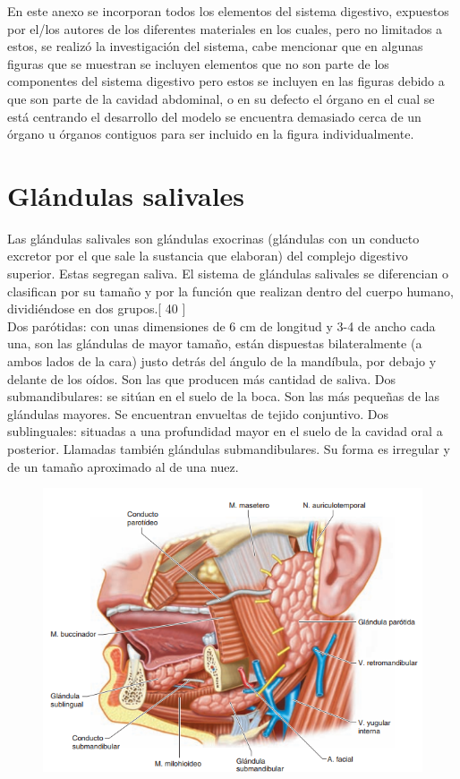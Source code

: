 \appendix  
\addappheadtotoc 
\appendixpage 

En este anexo se incorporan todos los elementos del sistema digestivo, expuestos por el/los autores de los diferentes materiales en los cuales, 
pero no limitados a estos, se realizó la investigación del sistema, cabe mencionar que en algunas figuras que se muestran se incluyen elementos 
que no son parte de los componentes del sistema digestivo pero estos se incluyen en las figuras debido a que son parte de la cavidad abdominal, 
o en su defecto el órgano en el cual se está centrando el desarrollo del modelo se encuentra demasiado cerca de un órgano u órganos contiguos 
para ser incluido en la figura individualmente.\\

\section{Glándulas salivales}
Las glándulas salivales son glándulas exocrinas (glándulas con un conducto excretor por el que sale la sustancia que elaboran) del complejo digestivo 
superior. Estas segregan saliva. El sistema de  glándulas salivales se diferencian o clasifican por  su tamaño y por la función que realizan dentro 
del cuerpo humano, dividiéndose en dos grupos.[ 40 ]\\ 
Dos parótidas: con unas dimensiones de 6 cm de longitud y 3-4 de ancho cada una, son las glándulas de mayor tamaño, están dispuestas bilateralmente 
(a ambos lados de la cara) justo detrás del ángulo de la mandíbula, por debajo y delante de los oídos. Son las que producen más cantidad de saliva.
Dos submandibulares: se sitúan en el suelo de la boca. Son las más pequeñas de las glándulas mayores. Se encuentran envueltas de tejido conjuntivo.
Dos sublinguales: situadas a una profundidad mayor en el suelo de la cavidad oral a posterior. Llamadas también glándulas submandibulares. Su forma 
es irregular y de un tamaño aproximado al de una nuez.\\
\begin{figure}[H]
	\begin{center}
 		\includegraphics[width = 1\textwidth]{v2/images/image34.png}
	\end{center} 
\end{figure}

